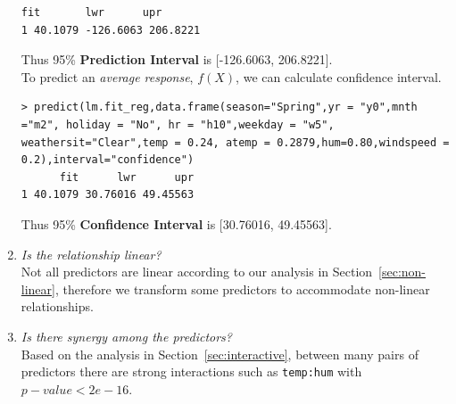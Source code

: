 \begin{enumerate}
\begin{lstlisting}[style = rlanguage]
      fit       lwr      upr
1 40.1079 -126.6063 206.8221
\end{lstlisting}
Thus 95\% \textbf{Prediction Interval} is [-126.6063, 206.8221].\\
To predict an \emph{average response}, $f(X)$, we can calculate confidence interval.
\begin{lstlisting}[style = rlanguage]
> predict(lm.fit_reg,data.frame(season="Spring",yr = "y0",mnth ="m2", holiday = "No", hr = "h10",weekday = "w5", weathersit="Clear",temp = 0.24, atemp = 0.2879,hum=0.80,windspeed = 0.2),interval="confidence")
      fit      lwr      upr
1 40.1079 30.76016 49.45563
\end{lstlisting}
Thus 95\% \textbf{Confidence Interval} is [30.76016, 49.45563].
  \item \textit{Is the relationship linear?}\\
  Not all predictors are linear according to our analysis in Section~\ref{sec:non-linear}, therefore we transform some predictors to accommodate non-linear relationships.
  \item \textit{ Is there synergy among the predictors?}\\
  Based on the analysis in Section~\ref{sec:interactive}, between many pairs of predictors there are strong interactions such as \texttt{temp:hum} with $p-value < 2e-16$.
      
\end{enumerate}
